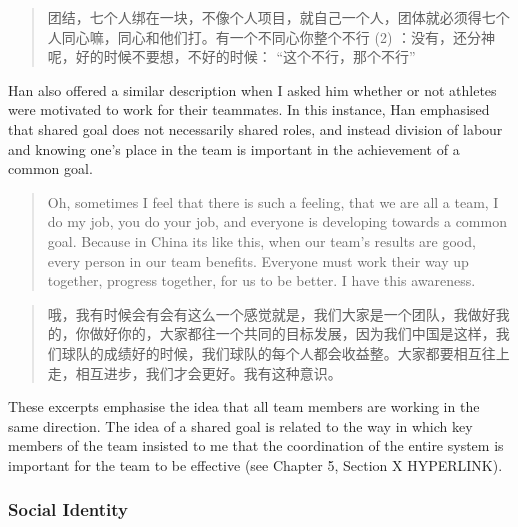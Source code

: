 \begin{CJK}{UTF8}{gbsn}
  \begin{quotation}
    团结，七个人绑在一块，不像个人项目，就自己一个人，团体就必须得七个人同心嘛，同心和他们打。有一个不同心你整个不行 (2) ：没有，还分神呢，好的时候不要想，不好的时候： ``这个不行，那个不行''
  \end{quotation}

  Han also offered a similar description when I asked him whether or not athletes were motivated to work for their teammates. In this instance, Han emphasised that shared goal does not necessarily shared roles, and instead division of labour and knowing one's place in the team is important in the achievement of a common goal.

    \begin{quotation}
        Oh, sometimes I feel that there is such a feeling, that we are all a team, I do my job, you do your job, and everyone is developing towards a common goal.  Because in China its like this, when our team’s results are good, every person in our team benefits.  Everyone must work their way up together, progress together, for us to be better. I have this awareness.
    \end{quotation}

  \begin{quotation}
      	哦，我有时候会有会有这么一个感觉就是，我们大家是一个团队，我做好我的，你做好你的，大家都往一个共同的目标发展，因为我们中国是这样，我们球队的成绩好的时候，我们球队的每个人都会收益整。大家都要相互往上走，相互进步，我们才会更好。我有这种意识。 
  \end{quotation}

These excerpts emphasise the idea that all team members are working in the same direction. The idea of a shared goal is related to the way in which key members of the team insisted to me that the coordination of the entire system is important for the team to be effective (see Chapter 5, Section X HYPERLINK).




\subsubsection{Social Identity}


\end{CJK}
